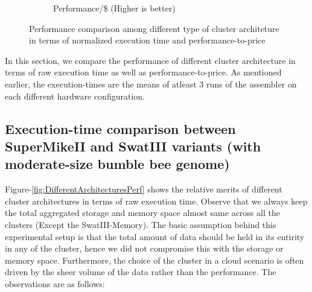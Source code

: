 \documentclass[conference]{IEEEtran}
\begin{document}
\begin{figure}[htb]
\begin{subfigure}[b]{0.5\textwidth}
                \caption{Performance/\$ (Higher is better)}
                \label{fig:DifferentArchitecturesPerfPerDollar}
        \end{subfigure}
        \caption{Performance comparison among different type of cluster architeture in terms of normalized execution time and performance-to-price}
  \label{fig:DifferentArchitectures}
  \vspace{-1.5em}
\end{figure}
In this section, we compare the performance of different cluster architecture in terms of raw execution time as well as performance-to-price.
As mentioned earlier, the execution-times are the means of atleast 3 runs of the assembler on each different hardware configuration.
\subsection {Execution-time comparison between SuperMikeII and SwatIII variants (with moderate-size bumble bee genome)} \label{ExecutionTimeDiffArchBumblebee}
Figure-\ref{fig:DifferentArchitecturesPerf} shows the relative merits of different cluster architectures in terms of raw execution time.
Observe that we always keep the total aggregated storage and memory space almost same across all the clusters (Except the SwatIII-Memory).
The basic assumption behind this experimental setup is that the total amount of data should be held in its entirity in any of the cluster, hence we did not compromise this with the storage or memory space. 
Furthermore, the choice of the cluster in a cloud scenario is often driven by the sheer volume of the data rather than the performance.
The observations are as follows:
\end{document}
